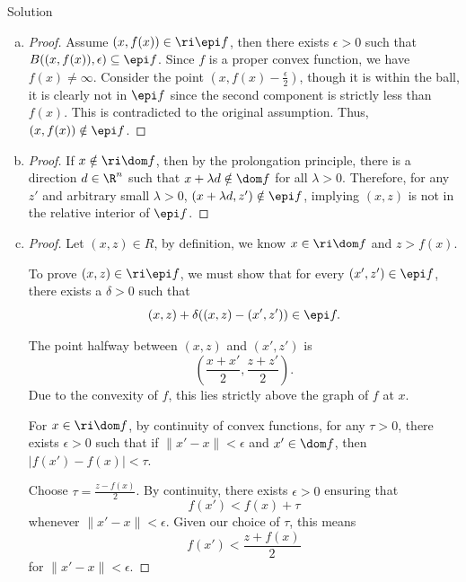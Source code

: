\documentclass{article}
\theoremstyle{plain}
\theoremstyle{definition}
\theoremstyle{remark}
\begin{document}
\begin{solution}
    {Solution}
    \begin{enumerate}[(a)]
        \item {
                \begin{proof}
                    Assume $(x,f(x))\in\ri\epi f$, then there exists $\epsilon>0$ such that $B((x,f(x)),\epsilon)\subseteq\epi f$. Since $f$ is a proper convex function, we have $f(x)\neq\infty$. Consider the point $(x, f(x)-\frac{\epsilon}{2})$, though it is within the ball, it is clearly not in $\epi f$ since the second component is strictly less than $f(x)$. This is contradicted to the original assumption. Thus, $(x,f(x))\notin\epi f$.
                \end{proof}
        }
        \item {
            \begin{proof}
                If $x\notin \ri\dom f$, then by the prolongation principle, there is a direction $d\in\R^n$ such that $x+\lambda d\notin \dom f$ for all $\lambda>0$. Therefore, for any $z'$ and arbitrary small  $\lambda>0$, $(x+\lambda d, z')\notin \epi f$, implying $(x,z)$ is not in the relative interior of $\epi f$.
            \end{proof}
        }
        \item {
            \begin{proof}
                Let $(x, z) \in R$, by definition, we know $x \in \ri\dom f$ and $z > f(x)$.

                To prove $(x,z) \in \ri\epi f$, we must show that for every $(x', z') \in \epi f$, there exists a $\delta > 0$ such that
                \[(x, z) + \delta((x, z) - (x', z')) \in \epi f.\]

                The point halfway between $(x, z)$ and $(x', z')$ is
                \[ \left( \frac{x + x'}{2}, \frac{z + z'}{2} \right). \]
                Due to the convexity of $f$, this lies strictly above the graph of $f$ at $x$.

                For $x \in \ri\dom f$, by continuity of convex functions, for any $\tau > 0$, there exists $\epsilon > 0$ such that if $\|x' - x\| < \epsilon$ and $x' \in \dom f$, then $|f(x') - f(x)| < \tau$.

                Choose $\tau = \frac{z - f(x)}{2}$. By continuity, there exists $\epsilon > 0$ ensuring that
                \[ f(x') < f(x) + \tau \]
                whenever $\|x' - x\| < \epsilon$. Given our choice of $\tau$, this means
                \[ f(x') < \frac{z + f(x)}{2} \]
                for $\|x' - x\| < \epsilon$.


\end{proof}}
\end{enumerate}
\end{solution}
\end{document}

